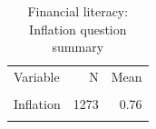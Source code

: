\begin{table}[htbp]\centering\small
\caption{Financial literacy: Inflation question summary}
\label{tab:finlit_q2_summary}
\begin{tabular}{lrr}\toprule
Variable & N & Mean \\\\ \midrule
Inflation & 1273 & 0.76 \\\\
\bottomrule
\end{tabular}\end{table}
